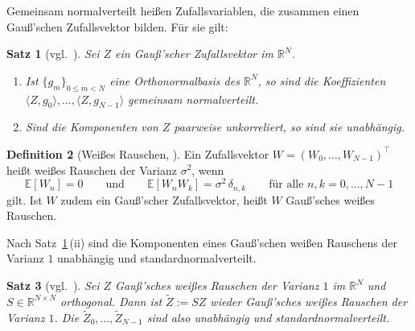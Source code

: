 \documentclass[a4paper,11pt,bibliography=totoc,listof=totoc,headinclude=true,cleardoublepage=empty,oneside]{scrbook}
\theoremstyle{plain}
\newtheorem{Satz}{Satz}[chapter]
\theoremstyle{definition}
\newtheorem{Definition}[Satz]{Definition}
\newcommand{\R}{\mathbb{R}}
\newcommand{\scal}[2]{\langle #1, #2 \rangle}
\begin{document}
Gemeinsam normalverteilt hei\ss en Zufallsvariablen, die zusammen einen
Gau\ss'schen Zufallsvektor bilden. Für sie gilt:

\begin{Satz}[vgl.\ {\cite[Kap.~10.3.2]{mallat}}] %
\label{satz:unkorreliert-unabhaengig}
Sei $Z$ ein Gau\ss'scher Zufallsvektor im $\R^N$.
\begin{enumerate}
\item[(i)] Ist $\{g_m\}_{0\le m<N}$ eine Orthonormalbasis des $\R^N$, so sind
die Koeffizienten $\scal{Z}{g_0},\dots,\scal{Z}{g_{N-1}}$ gemeinsam
normalverteilt.
\item[(ii)] Sind die Komponenten von $Z$ paarweise unkorreliert, so sind sie
unabhängig.
\end{enumerate}
\end{Satz}

\begin{Definition}[Wei\ss es Rauschen, {\cite[Kap.~11.2.1]{mallat}}] %
\label{def:weisses-rauschen}
Ein Zufallsvektor $W = (W_0,\dots,W_{N-1})^\top$ hei\ss t wei\ss es Rauschen der
Varianz $\sigma^2$, wenn
\[
  \mathbb E[W_n] = 0 \qquad\text{und}\qquad
  \mathbb E[W_nW_k] = \sigma^2\,\delta_{n,k}
  \qquad\text{für alle } n,k = 0,\dots,N-1
\]
gilt. Ist $W$ zudem ein Gau\ss'scher Zufallsvektor, hei\ss t $W$
Gau\ss'sches wei\ss es Rauschen.
\end{Definition}

Nach Satz~\ref{satz:unkorreliert-unabhaengig}\,(ii) sind die Komponenten eines
Gau\ss'schen wei\ss en Rauschens der Varianz $1$ unabhängig und
standardnormalverteilt.

\begin{Satz}[{vgl.\ \cite[Kap.~11.2.1--11.2.2]{mallat}}] %
\label{satz:rauschen-orthogonal}
Sei $Z$ Gau\ss'sches wei\ss es Rauschen der Varianz $1$ im $\R^N$ und
$S\in\R^{N\times N}$ orthogonal. Dann ist $\tilde Z := SZ$ wieder
Gau\ss'sches wei\ss es Rauschen der Varianz $1$. Die
$\tilde Z_0,\dots,\tilde Z_{N-1}$ sind also unabhängig und
standardnormalverteilt.
\end{Satz}
\end{document}

